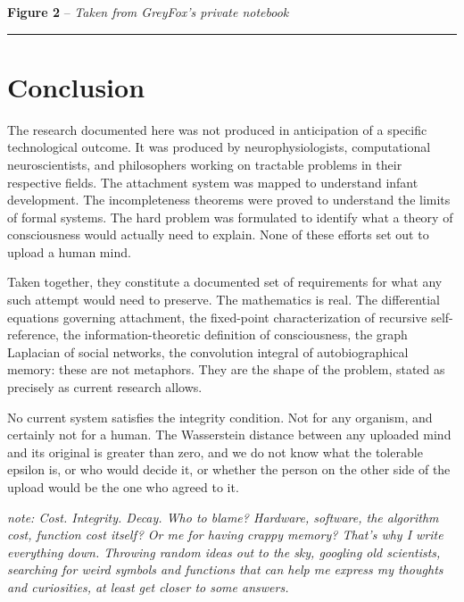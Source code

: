 \documentclass[11pt,a4paper]{article}
\newcommand{\nbk}[1]{\par\vspace{0.3em}\noindent\textit{note: #1}\par\vspace{0.3em}}
\begin{document}
\vspace{0.4em}
\begin{center}
\textbf{Figure 2} \;--\; \textit{Taken from GreyFox's private notebook}
\end{center}

\vspace{0.2em}
\noindent\rule{\textwidth}{0.8pt}

\section{Conclusion}

The research documented here was not produced in anticipation of a specific technological outcome. It was produced by neurophysiologists, computational neuroscientists, and philosophers working on tractable problems in their respective fields. The attachment system was mapped to understand infant development. The incompleteness theorems were proved to understand the limits of formal systems. The hard problem was formulated to identify what a theory of consciousness would actually need to explain. None of these efforts set out to upload a human mind.

Taken together, they constitute a documented set of requirements for what any such attempt would need to preserve. The mathematics is real. The differential equations governing attachment, the fixed-point characterization of recursive self-reference, the information-theoretic definition of consciousness, the graph Laplacian of social networks, the convolution integral of autobiographical memory: these are not metaphors. They are the shape of the problem, stated as precisely as current research allows.

No current system satisfies the integrity condition. Not for any organism, and certainly not for a human. The Wasserstein distance between any uploaded mind and its original is greater than zero, and we do not know what the tolerable epsilon is, or who would decide it, or whether the person on the other side of the upload would be the one who agreed to it.

\nbk{Cost. Integrity. Decay. Who to blame? Hardware, software, the algorithm cost, function cost itself? Or me for having crappy memory? That's why I write everything down. Throwing random ideas out to the sky, googling old scientists, searching for weird symbols and functions that can help me express my thoughts and curiosities, at least get closer to some answers.}
\end{document}

